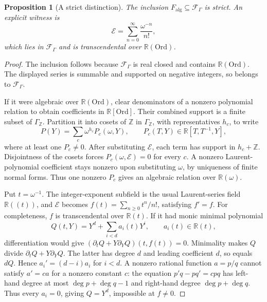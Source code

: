 \documentclass[11pt,a4paper]{article}
\numberwithin{equation}{section}
\newtheorem{proposition}[proposition]{Proposition}
\theoremstyle{definition}
\theoremstyle{remark}
\newcommand{\Ord}{\mathrm{Ord}}
\newcommand{\Z}{\mathbb Z}
\newcommand{\R}{\mathbb R}
\begin{document}
\begin{proposition}[A strict distinction]\label{dsn:rp:prop:strict}
The inclusion \(F_{\mathrm{alg}}\subseteq\mathcal F_\Gamma\) is strict.
An explicit witness is
\begin{equation}\label{dsn:rp:eq:formal-exp}
 \mathcal E=\sum_{n=0}^{\infty}\frac{\omega^{-n}}{n!},
\end{equation}
which lies in \(\mathcal F_\Gamma\) and is transcendental over \(\R(\Ord)\).
\end{proposition}

\begin{proof}
The inclusion follows because \(\mathcal F_\Gamma\) is real closed and
contains \(\R(\Ord)\). The displayed series is summable and supported on
negative integers, so belongs to \(\mathcal F_\Gamma\).

If it were algebraic over \(\R(\Ord)\), clear denominators of a nonzero
polynomial relation to obtain coefficients in \(\R[\Ord]\). Their
combined support is a finite subset of \(\Gamma_{\Z}\). Partition it into
cosets of \(\mathbb Z\) in \(\Gamma_{\Z}\), with representatives \(h_c\), to write
\[
 P(Y)=\sum_c\omega^{h_c}P_c(\omega,Y),\qquad
 P_c(T,Y)\in\R[T,T^{-1},Y],
\]
where at least one \(P_c\ne0\). After substituting \(\mathcal E\), each term
has support in \(h_c+\mathbb Z\). Disjointness of the cosets forces
\(P_c(\omega,\mathcal E)=0\) for every \(c\).
A nonzero Laurent-polynomial coefficient stays nonzero upon
substituting \(\omega\), by uniqueness of finite normal forms.
Thus one nonzero \(P_c\) gives an algebraic relation over \(\R(\omega)\).

Put \(t=\omega^{-1}\). The integer-exponent subfield is the usual
Laurent-series field \(\R((t))\), and \(\mathcal E\) becomes
\(f(t)=\sum_{n\ge0}t^n/n!\), satisfying \(f'=f\).
For completeness, \(f\) is transcendental over \(\R(t)\).
If it had monic minimal polynomial
\[
 Q(t,Y)=Y^d+\sum_{i<d}a_i(t)Y^i,\qquad a_i(t)\in\R(t),
\]
differentiation would give
\((\partial_tQ+Y\partial_YQ)(t,f(t))=0\).
Minimality makes \(Q\) divide \(\partial_tQ+Y\partial_YQ\).
The latter has degree \(d\) and leading coefficient \(d\), so equals
\(dQ\). Hence \(a_i'=(d-i)a_i\) for \(i<d\).
A nonzero rational function \(a=p/q\) cannot satisfy \(a'=ca\) for a
nonzero constant \(c\): the equation
\(p'q-pq'=cpq\) has left-hand degree at most
\(\deg p+\deg q-1\) and right-hand degree \(\deg p+\deg q\).
Thus every \(a_i=0\), giving \(Q=Y^d\), impossible at \(f\ne0\).
\end{proof}
\end{document}
